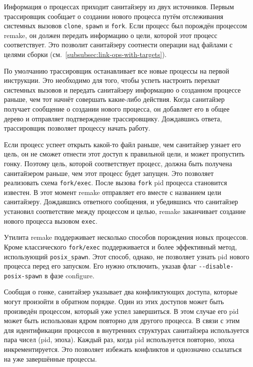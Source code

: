 Информация о процессах приходит санитайзеру из двух источников. Первым трассировщик сообщает о создании нового процесса путём отслеживания системных вызовов \texttt{clone}, \texttt{spawn} и \texttt{fork}. Если процесс был порождён процессом remake, он должен передать информацию о цели, которой этот процесс соответствует. Это позволит санитайзеру соотнести операции над файлами с целями сборки (см.~\ref{subsubsec:link-ops-with-targets}).

По умолчанию трассировщик останавливает все новые процессы на первой инструкции. Это необходимо для того, чтобы успеть настроить перехват системных вызовов и передать санитайзеру информацию о созданном процессе раньше, чем тот начнёт совершать какие-либо действия. Когда санитайзер получает сообщение о создании нового процесса, он добавляет его в общее дерево и отправляет подтверждение трассировщику. Дождавшись ответа, трассировщик позволяет процессу начать работу.

Если процесс успеет открыть какой-то файл раньше, чем санитайзер узнает его цель, он не сможет отнести этот доступ к правильной цели, и может пропустить гонку. Поэтому цель, которой соответствует процесс, должна быть получена санитайзером раньше, чем этот процесс будет запущен. Это позволяет реализовать схема \texttt{fork/exec}. После вызова \texttt{fork} pid процесса становится известен. В этот момент remake отправляет его вместе с названием цели санитайзеру. Дождавшись ответного сообщения, и убедившись что санитайзер установил соответствие между процессом и целью, remake заканчивает создание нового процесса вызовом \texttt{exec}.

Утилита remake поддерживает несколько способов порождения новых процессов. Кроме классического \texttt{fork/exec} поддерживается и более эффективный метод, использующий \texttt{posix\_spawn}. Этот способ, однако, не позволяет узнать pid нового процесса перед его запуском. Его нужно отключить, указав флаг \texttt{-{}-disable-posix-spawn} в фазе configure.

Сообщая о гонке, санитайзер указывает два конфликтующих доступа, которые могут произойти в обратном порядке. Один из этих доступов может быть произведён процессом, который уже успел завершиться. В этом случае его pid может быть использован ядром повторно для другого процесса. В связи с этим для идентификации процессов в внутренних структурах санитайзера используется пара чисел (pid, эпоха). Каждый раз, когда pid используется повторно, эпоха инкрементируется. Это позволяет избежать конфликтов и однозначно ссылаться на уже завершённые процессы.

